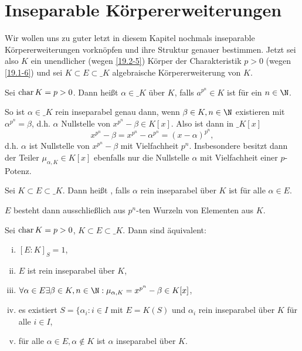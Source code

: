 \section{Inseparable Körpererweiterungen}

Wir wollen uns zu guter letzt in diesem Kapitel nochmals inseparable Körpererweiterungen vorknöpfen und ihre Struktur genauer bestimmen.
Jetzt sei also $K$ ein unendlicher (wegen \ref{19.2-5}) Körper der Charakteristik $p > 0$ (wegen \ref{19.1-6}) und sei $K \subset E \subset \_K$ algebraische Körpererweiterung von $K$.

\begin{df} \label{19.6-1}
	Sei $\operatorname{char} K = p > 0$.
	Dann heißt $\alpha \in \_K$  über $K$, falls $a^{p^n} \in K$ ist für ein $n \in \N$.
	\begin{note}
		So ist $\alpha \in \_K$ rein inseparabel genau dann, wenn $\beta \in K, n \in \N$ existieren mit $\alpha^{p^n} = \beta$, d.h. $\alpha$ Nullstelle von $x^{p^n} - \beta \in K[x]$.
		Also ist dann in $\_K[x]$
		\[
			x^{p^n} - \beta
			= x^{p^n} - \alpha^{p^n}
			= (x - \alpha)^{p^n},
		\]
		d.h. $\alpha$ ist Nullstelle von $x^{p^n} - \beta$ mit Vielfachheit $p^n$.
		Insbesondere besitzt dann der Teiler $\mu_{\alpha, K} \in K[x]$ ebenfalls nur die Nullstelle $\alpha$ mit Vielfachheit einer $p$-Potenz.
	\end{note}
\end{df}

\begin{df} \label{19.6-2}
	Sei $K \subset E \subset \_K$.
	Dann heißt , falls $\alpha$ rein inseparabel über $K$ ist für alle $\alpha \in E$.
	\begin{note}
		$E$ besteht dann ausschließlich aus $p^n$-ten Wurzeln von Elementen aus $K$.
	\end{note}
\end{df}

\begin{st} \label{19.6-3}
	Sei $\operatorname{char} K = p > 0$, $K \subset E \subset \_K$.
	Dann sind äquivalent:
	\begin{enumerate}[i)]
		\item
			$[E : K]_S = 1$,
		\item
			$E$ ist rein inseparabel über $K$,
		\item
			$\forall \alpha \in E \exists \beta \in K, n \in \N : \mu_{\alpha, K} = x^{p^n} - \beta \in K[x]$,
		\item
			es existiert $S = \{\alpha_i : i \in I$ mit $E = K(S)$ und $\alpha_i$ rein inseparabel über $K$ für alle $i \in I$,
		\item
			für alle $\alpha \in E, \alpha \not\in K$ ist $\alpha$ inseparabel über $K$.
	\end{enumerate}
\end{st}

